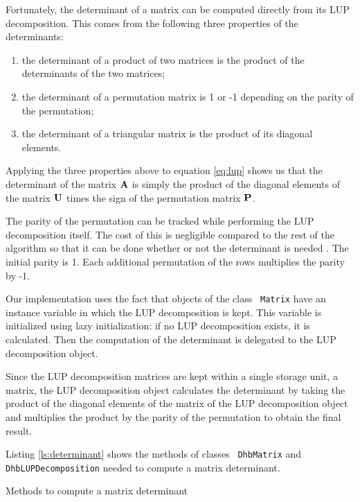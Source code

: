 \documentclass[twoside]{book}
\begin{document}
Fortunately, the determinant of a matrix can be computed directly
from its LUP decomposition. This comes from the following three
properties of the determinants:
\begin{enumerate}
  \item the determinant of a product of two matrices is the product of the determinants of the two
  matrices;
  \item the determinant of a permutation matrix is 1 or -1 depending on the parity of the
  permutation;
  \item the determinant of a triangular matrix is the product of its diagonal elements.
\end{enumerate}
Applying the three properties above to equation \ref{eq:lup} shows
us that the determinant of the matrix ${\bf A}$ is simply the
product of the diagonal elements of the matrix ${\bf U}$ times the
sign of the permutation matrix ${\bf P}$.

The parity of the permutation can be tracked while performing the
LUP decomposition itself. The cost of this is negligible compared
to the rest of the algorithm so that it can be done whether or not
the determinant is needed . The initial parity is 1. Each
additional permutation of the rows multiplies the parity by -1.

Our implementation uses the fact that objects of the class {\tt
Matrix} have an instance variable in which the LUP decomposition
is kept. This variable is initialized using lazy initialization:
if no LUP decomposition exists, it is calculated. Then the
computation of the determinant is delegated to the LUP
decomposition object.

Since the LUP decomposition matrices are kept within a single
storage unit, a matrix, the LUP decomposition object calculates
the determinant by taking the product of the diagonal elements of
the matrix of the LUP decomposition object and multiplies the
product by the parity of the permutation to obtain the final
result.

Listing \ref{ls:determinant} shows the methods of classes {\tt
DhbMatrix} and {\tt DhbLUPDecomposition} needed to compute a
matrix determinant.

\begin{listing} Methods to compute a matrix determinant \label{ls:determinant}


\end{listing}
\end{document}
